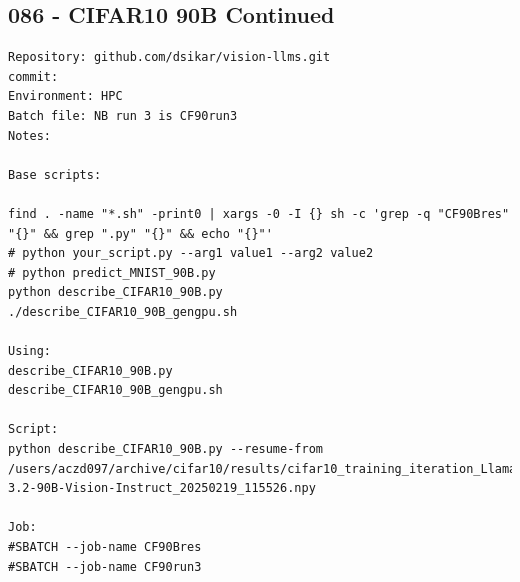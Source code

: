 \subsection{086 - CIFAR10 90B Continued}
\label{app_res:085}
\begin{verbatim}
Repository: github.com/dsikar/vision-llms.git
commit: 
Environment: HPC 
Batch file: NB run 3 is CF90run3
Notes: 

Base scripts:

find . -name "*.sh" -print0 | xargs -0 -I {} sh -c 'grep -q "CF90Bres" "{}" && grep ".py" "{}" && echo "{}"'
# python your_script.py --arg1 value1 --arg2 value2
# python predict_MNIST_90B.py
python describe_CIFAR10_90B.py
./describe_CIFAR10_90B_gengpu.sh

Using:
describe_CIFAR10_90B.py
describe_CIFAR10_90B_gengpu.sh

Script:
python describe_CIFAR10_90B.py --resume-from /users/aczd097/archive/cifar10/results/cifar10_training_iteration_Llama-3.2-90B-Vision-Instruct_20250219_115526.npy

Job:
#SBATCH --job-name CF90Bres
#SBATCH --job-name CF90run3 


\end{verbatim}


